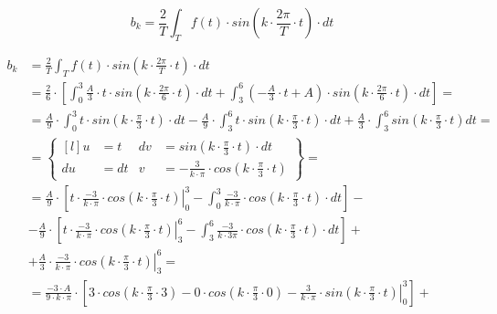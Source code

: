 \begin{task}

\begin{equation}
b_k=\frac{2}{T}\int_{T}f(t) \cdot sin\left( k \cdot \frac{2\pi}{T} \cdot t\right) \cdot dt
\end{equation}


\begin{align*}
b_k&=\frac{2}{T}\int_{T}f(t) \cdot sin\left( k \cdot \frac{2\pi}{T} \cdot t\right) \cdot dt\\
&=\frac{2}{6} \cdot \left[\int_{0}^{3}\frac{A}{3}\cdot t \cdot sin\left( k \cdot \frac{2\pi}{6} \cdot t\right) \cdot dt
+\int_{3}^{6}\left(-\frac{A}{3}\cdot t + A\right) \cdot sin\left( k \cdot \frac{2\pi}{6} \cdot t\right) \cdot dt \right]=\\
&=\frac{A}{9} \cdot \int_{0}^{3} t \cdot sin\left( k \cdot \frac{\pi}{3} \cdot t\right) \cdot dt
- \frac{A}{9} \cdot \int_{3}^{6} t \cdot sin\left( k \cdot \frac{\pi}{3} \cdot t\right) \cdot dt + \frac{A}{3} \cdot \int_{3}^{6} sin\left( k \cdot \frac{\pi}{3} \cdot t\right) dt=\\
&=\begin{Bmatrix*}[l]
u&=t & dv&=sin\left( k \cdot \frac{\pi}{3} \cdot t\right) \cdot dt \\
du&=dt & v&=-\frac{3}{k\cdot \pi}\cdot cos\left( k \cdot \frac{\pi}{3} \cdot t\right)
\end{Bmatrix*}=\\
&=\frac{A}{9} \cdot \left[\left. t \cdot \frac{-3}{k\cdot \pi}\cdot cos\left( k \cdot \frac{\pi}{3} \cdot t\right) \right|_{0}^{3} - \int_{0}^{3} \frac{-3}{k\cdot \pi}\cdot cos\left( k \cdot \frac{\pi}{3} \cdot t\right) \cdot dt \right]-\\
&-\frac{A}{9} \cdot \left[\left. t \cdot \frac{-3}{k\cdot \pi}\cdot cos\left( k \cdot \frac{\pi}{3} \cdot t\right) \right|_{3}^{6} - \int_{3}^{6}  \frac{-3}{k\cdot 3\pi}\cdot cos\left( k \cdot \frac{\pi}{3} \cdot t\right) \cdot dt \right]+\\
&+ \frac{A}{3} \cdot \left. \frac{-3}{k\cdot \pi}\cdot cos\left( k \cdot \frac{\pi}{3} \cdot t\right) \right|_{3}^{6}=\\
&=\frac{-3 \cdot A}{9 \cdot k \cdot \pi} \cdot \left[ 3 \cdot cos\left( k \cdot \frac{\pi}{3} \cdot 3\right) -  0 \cdot cos\left( k \cdot \frac{\pi}{3} \cdot 0\right)
- \left. \frac{3}{k\cdot \pi}\cdot sin\left( k \cdot \frac{\pi}{3} \cdot t\right) \right|_{0}^{3}\right]+\\

\end{align*}
\end{task}
